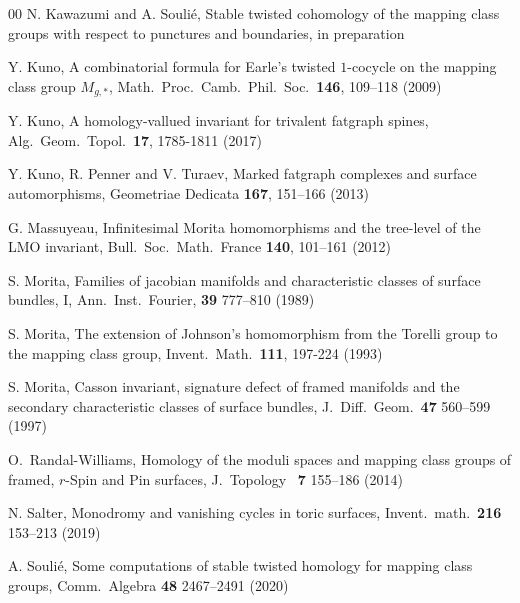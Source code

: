 \documentclass[a4paper,12pt, twoside]{amsart}
\theoremstyle{definition}
\theoremstyle{remark}
\numberwithin{equation}{section}
\begin{document}
\begin{thebibliography}{00}
N. Kawazumi and A. Souli\'e, 
Stable twisted cohomology of the mapping class groups with respect to punctures and boundaries, 
in preparation



Y. Kuno,
A combinatorial formula for Earle's twisted $1$-cocycle on the mapping class group $M_{g,*}$,
Math.\ Proc.\ Camb.\ Phil.\ Soc.\ \textbf{146}, 109--118 (2009) 

Y. Kuno,
A homology-vallued invariant for trivalent fatgraph spines,
Alg.\ Geom.\ Topol.\ \textbf{17}, 1785-1811 (2017)

Y. Kuno, R. Penner and V. Turaev,
Marked fatgraph complexes and surface automorphisms,
Geometriae Dedicata \textbf{167}, 151--166 (2013) 

G. Massuyeau, 
Infinitesimal Morita homomorphisms and the tree-level of the LMO invariant, Bull.\ Soc.\ Math.\ France \textbf{140}, 101--161 (2012) 

S. Morita, 
Families of jacobian manifolds and characteristic classes of surface bundles, I, 
Ann.\ Inst.\ Fourier,  \textbf{39} 777--810 (1989) 

S. Morita, 
The extension of Johnson's
homomorphism from the Torelli group to the mapping class group,
Invent.\ Math.\ \textbf{111}, 197-224 (1993)

S. Morita, 
Casson invariant, signature defect of framed manifolds and the secondary characteristic classes of surface bundles,
J.\ Diff.\ Geom.\  \textbf{47} 560--599 (1997) 

O.\ Randal-Williams, 
Homology of the moduli spaces and mapping class groups of framed, 
$r$-Spin and Pin surfaces,
J.\ Topology \ \textbf{7} 155--186 (2014)

N. Salter, 
Monodromy and vanishing cycles in toric surfaces, 
Invent.\ math.\ \textbf{216} 153--213 (2019)

A. Souli\'e,
Some computations of stable twisted homology for mapping class groups, Comm.\, Algebra \textbf{48} 2467--2491 (2020)



\end{thebibliography}
\end{document}
